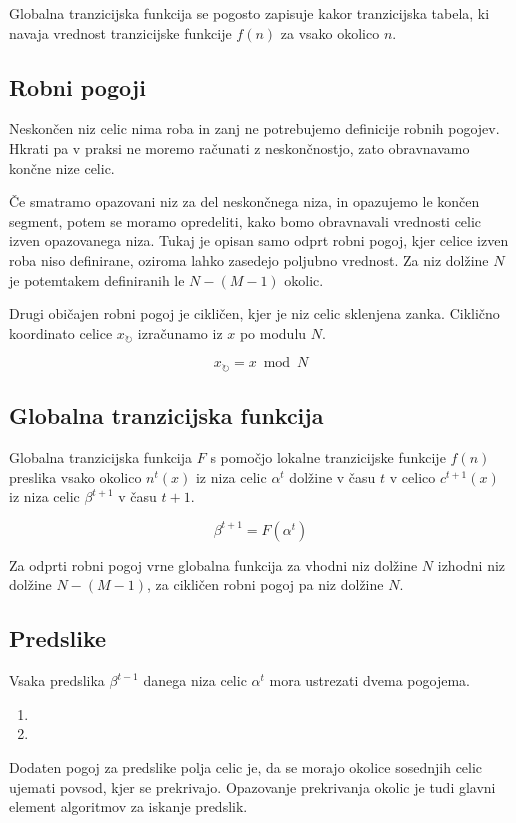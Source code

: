 \documentclass[12pt,a4paper,openany,twoside]{book}
\begin{document}
Globalna tranzicijska funkcija se pogosto zapisuje kakor tranzicijska tabela,
ki navaja vrednost tranzicijske funkcije \(f(n)\) za vsako okolico \(n\).

\subsection{Robni pogoji}

Neskončen niz celic nima roba in zanj ne potrebujemo definicije robnih pogojev.
Hkrati pa v praksi ne moremo računati z neskončnostjo,
zato obravnavamo končne nize celic.

Če smatramo opazovani niz za del neskončnega niza, in opazujemo le končen segment,
potem se moramo opredeliti, kako bomo obravnavali vrednosti celic izven opazovanega niza.
Tukaj je opisan samo odprt robni pogoj, kjer celice izven roba niso definirane,
oziroma lahko zasedejo poljubno vrednost.
Za niz dolžine \(N\) je potemtakem definiranih le \(N-(M-1)\) okolic.

Drugi običajen robni pogoj je cikličen, kjer je niz celic sklenjena zanka.
Ciklično koordinato celice \(x_{\circlearrowright}\) izračunamo iz \(x\) po modulu \(N\).

\begin{equation}
x_{\circlearrowright} = x \bmod N
\end{equation}

\subsection{Globalna tranzicijska funkcija}

Globalna tranzicijska funkcija \(F\) s pomočjo lokalne tranzicijske funkcije \(f(n)\)
preslika vsako okolico \(n^t(x)\) iz niza celic \(\alpha^t\) dolžine v času \(t\)
v celico \(c^{t+1}(x)\) iz niza celic \(\beta^{t+1}\) v času \(t+1\).

\begin{equation}
\beta^{t+1} = F (\alpha^t)
\end{equation}

Za odprti robni pogoj vrne globalna funkcija za vhodni niz dolžine \(N\)
izhodni niz dolžine \(N-(M-1)\), za cikličen robni pogoj pa niz dolžine \(N\).

\subsection{Predslike}

Vsaka predslika \(\beta^{t-1}\) danega niza celic \(\alpha^t\) mora ustrezati dvema pogojema.
\begin{enumerate}
\item

\item
\end{enumerate}
Dodaten pogoj za predslike polja celic je, da se morajo okolice sosednjih celic
ujemati povsod, kjer se prekrivajo.
Opazovanje prekrivanja okolic je tudi glavni element algoritmov za iskanje predslik.
\end{document}
